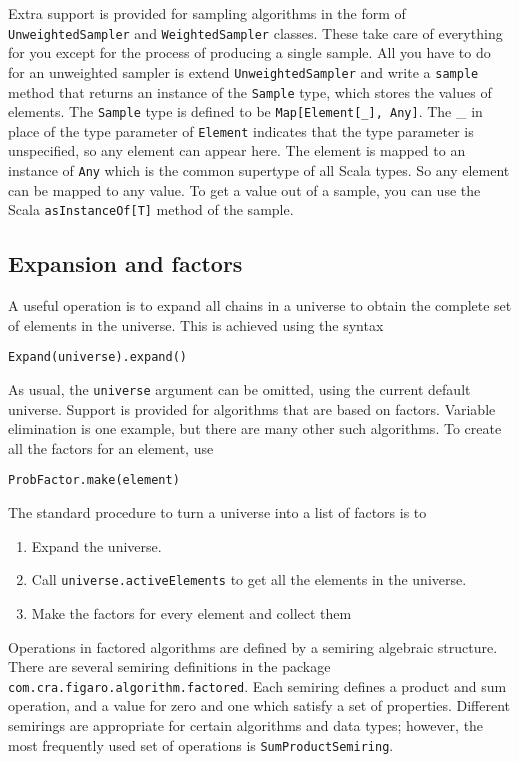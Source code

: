 Extra support is provided for sampling algorithms in the form of \texttt{UnweightedSampler} and \texttt{WeightedSampler} classes. These take care of everything for you except for the process of producing a single sample. All you have to do for an unweighted sampler is extend \texttt{Unweight\-edSampler} and write a \texttt{sample} method that returns an instance of the \texttt{Sample} type, which stores the values of elements. The \texttt{Sample} type is defined to be \texttt{Map[Element[\_], Any]}. The \_ in place of the type parameter of \texttt{Element} indicates that the type parameter is unspecified, so any element can appear here. The element is mapped to an instance of \texttt{Any} which is the common supertype of all Scala types. So any element can be mapped to any value. To get a value out of a sample, you can use the Scala \texttt{asInstanceOf[T]} method of the sample.

\subsection{Expansion and factors}

A useful operation is to expand all chains in a universe to obtain the complete set of elements in the universe. This is achieved using the syntax

\begin{flushleft}
\texttt{Expand(universe).expand()}
\end{flushleft}

As usual, the \texttt{universe} argument can be omitted, using the current default universe. Support is provided for algorithms that are based on factors. Variable elimination is one example, but there are many other such algorithms. To create all the factors for an element, use

\begin{flushleft}
\texttt{ProbFactor.make(element)}
\end{flushleft}

The standard procedure to turn a universe into a list of factors is to
\begin{enumerate}
\item Expand the universe.
\item Call \texttt{universe.activeElements} to get all the elements in the universe.
\item Make the factors for every element and collect them
\end{enumerate}

Operations in factored algorithms are defined by a semiring algebraic structure. There are several semiring definitions in the package \texttt{com.cra.figaro.algorithm.factored}. Each semiring defines a product and sum operation, and a value for zero and one which satisfy a set of properties. Different semirings are appropriate for certain algorithms and data types; however, the most frequently used set of operations is \texttt{SumProductSemiring}.

